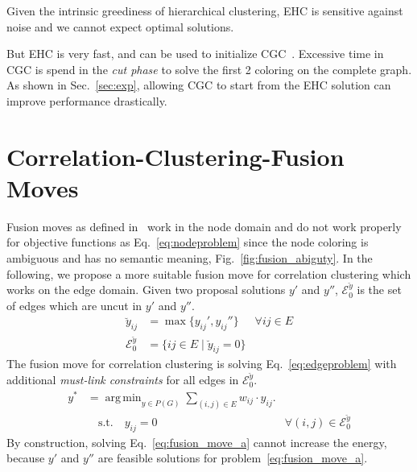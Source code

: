 \documentclass[10pt,twocolumn,letterpaper]{article}
\DeclareMathOperator*{\argmin}{arg\,min}
\theoremstyle{definition}
\begin{document}
Given the intrinsic greediness of hierarchical clustering, 
EHC is sensitive against noise and we cannot expect optimal solutions.

But EHC is very fast, and can be used to initialize
CGC~\cite{beier_2014_cvpr}. Excessive time in CGC
is spend in the \emph{cut phase} to solve the 
first 2 coloring on the complete graph.
As shown in Sec.~\ref{sec:exp},
allowing CGC to start from the EHC solution
can improve performance drastically.






\section{Correlation-Clustering-Fusion Moves}\label{sec:cc_fm}

Fusion moves as defined in~\cite{Lempitsky-2010} work
in the node domain and do not work properly for 
objective functions as Eq.~\ref{eq:nodeproblem} since
the node coloring is ambiguous and has no semantic meaning, \cf Fig.~\ref{fig:fusion_abiguty}.
In the following, we propose a more suitable fusion move for correlation
clustering which works on the edge domain.
%
Given two proposal solutions $y'$ and $y''$,
$\mathcal{E}_0^{\breve{y}}$ is the set of edges
which are uncut in $y'$ and $y''$.
%
\begin{align}
\breve{y}_{ij}    & = \max\{ y_{ij}', y_{ij}''\}  & \forall {ij}\in E\\  %
\mathcal{E}_0^{\breve{y}}  & =  \{ ij \in E \; | \; \breve{y}_{ij} = 0 \}
\end{align}
%
The fusion move for correlation clustering is solving Eq.~\ref{eq:edgeproblem}
with additional \emph{must-link constraints} for all edges in $\mathcal{E}_0^{\breve{y}}$.
%
\begin{align}
  y^* &= \argmin_{y \in P(G)} \sum_{ (i,j) \in E } w_{ij} \cdot y_{ij} \label{eq:fusion_move_a}.\\ 
      &\quad \textrm{s.t.} \quad y_{ij} = 0 & \forall (i, j) \in \mathcal{E}_0^{\breve{y}} \nonumber
\end{align}
%
By construction, solving Eq.~\ref{eq:fusion_move_a} cannot increase the energy,
because $y'$ and $y''$ are feasible solutions for problem~\ref{eq:fusion_move_a}.
%
\end{document}
